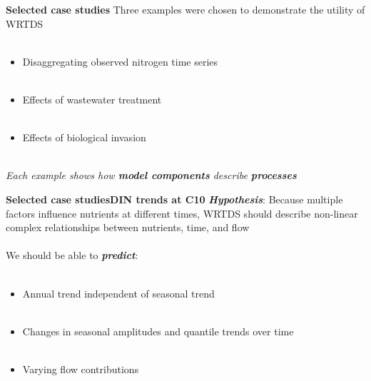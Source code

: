 \documentclass[serif]{beamer}\usepackage[]{graphicx}\usepackage[]{color}
\newcommand{\emtxt}[1]{\textbf{\textit{#1}}}
\begin{document}
\begin{frame}{\textbf{Selected case studies}}{\textbf{}}
Three examples were chosen to demonstrate the utility of WRTDS \\~\\
\begin{itemize}
\item Disaggregating observed nitrogen time series \\~\\
\item Effects of wastewater treatment \\~\\
\item Effects of biological invasion \\~\\
\end{itemize}
\centerline{\textit{Each example shows how {\bf model components} describe {\bf processes}}}
\end{frame}

\begin{frame}{\textbf{Selected case studies}}{\textbf{DIN trends at C10}}
\emtxt{Hypothesis}: Because multiple factors influence nutrients at different times, WRTDS should describe non-linear complex relationships between nutrients, time, and flow \\~\\
We should be able to \emtxt{predict}: \\~\\
\begin{itemize}
\item Annual trend independent of seasonal trend \\~\\
\item Changes in seasonal amplitudes and quantile trends over time \\~\\
\item Varying flow contributions 
\end{itemize}
\end{frame}
\end{document}
